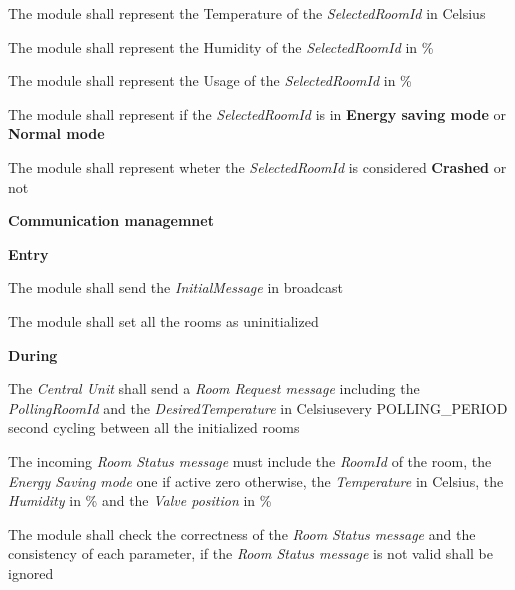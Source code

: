 \begin{req_enum}
\begin{req_enum}[label*=\arabic*.]
\begin{req_enum}[label*=\arabic*.]
							\item The module shall represent the Temperature of the \textit{SelectedRoomId} in Celsius\degree \\
							\item The module shall represent the Humidity of the \textit{SelectedRoomId} in \% \\
							\item The module shall represent the Usage of the \textit{SelectedRoomId} in \% \\
							\item The module shall represent if the \textit{SelectedRoomId} is in \textbf{Energy saving mode} or \textbf{Normal mode} \\
							\item The module shall represent wheter the \textit{SelectedRoomId} is considered \textbf{Crashed} or not\\
						\end{req_enum}
					\end{req_enum}
			\item \textbf{Communication managemnet}
				\begin{req_enum}[label*=\arabic*.]
					\item \textbf{Entry}
						\begin{req_enum}[label*=\arabic*.]
							\item The module shall send the \textit{InitialMessage} in broadcast
							\item The module shall set all the rooms as uninitialized
						\end{req_enum}	
					\item \textbf{During}
						\begin{req_enum}[label*=\arabic*.]
							\item The \textit{Central Unit} shall send a \textit{Room Request message} including the \textit{PollingRoomId} and the \textit{DesiredTemperature} in Celsius\degree every POLLING\_PERIOD   second cycling between all the initialized rooms
							\item The incoming \textit{Room Status message} must include the \textit{RoomId} of the room, the \textit{Energy Saving mode} one if active zero otherwise, the \textit{Temperature} in Celsius\degree, the \textit{Humidity} in \% and the \textit{Valve position} in \%
							\item The module shall check the correctness of the \textit{Room Status message} and the consistency of each parameter, if the \textit{Room Status message} is not valid shall be ignored

\end{req_enum}
\end{req_enum}
\end{req_enum}
